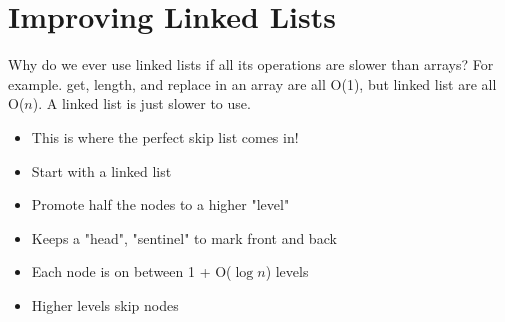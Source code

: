 \documentclass[10pt]{article}
\begin{document}
\section*{Improving Linked Lists}
Why do we ever use linked lists if all its operations are slower than arrays?  For example. get, length, and replace in an array are all O(1), but linked list are all O($n$).  A linked list is just slower to use.
\begin{itemize}
	\item This is where the perfect skip list comes in!
	\item Start with a linked list
	\item Promote half the nodes to a higher "level"
	\item Keeps a "head", "sentinel" to mark front and back
	\item Each node is on between 1 + O($\log n$) levels
	\item Higher levels skip nodes
\end{itemize}
\end{document}
